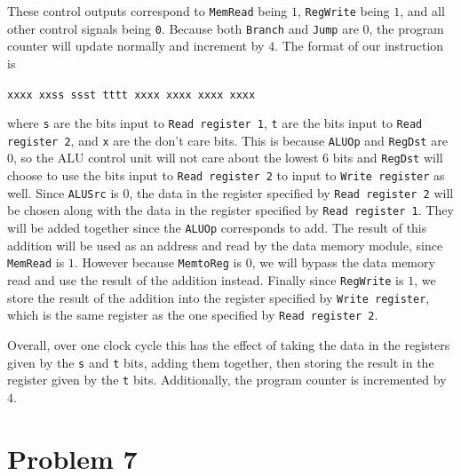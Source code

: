 \documentclass[12pt]{article}
\begin{document}
These control outputs correspond to \texttt{MemRead} being \(1\), \texttt{RegWrite} being \(1\), and all other control signals being
\texttt{0}. Because both \texttt{Branch} and \texttt{Jump} are \(0\), the program counter will update normally and increment by \(4\).
The format of our instruction is
\begin{center}
\texttt{xxxx xxss ssst tttt xxxx xxxx xxxx xxxx}
\end{center}
where \texttt{s} are the bits input to \texttt{Read register 1}, \texttt{t} are the bits input to \texttt{Read register 2}, and
\texttt{x} are the don't care bits. This is because \texttt{ALUOp} and \texttt{RegDst} are \(0\), so the ALU control unit will not care
about the lowest \(6\) bits and \texttt{RegDst} will choose to use the bits input to \texttt{Read register 2} to input to
\texttt{Write register} as well. Since \texttt{ALUSrc} is \(0\), the data in the register specified by \texttt{Read register 2}
will be chosen along with the data in the register specified by \texttt{Read register 1}. They will be added together since
the \texttt{ALUOp} corresponds to add. The result of this addition will be used as an address and read by the data memory module,
since \texttt{MemRead} is \(1\). However because  \texttt{MemtoReg} is \(0\), we will bypass the data memory read and use the result of
the addition instead. Finally since \texttt{RegWrite} is \(1\), we store the result of the addition into the register specified
by \texttt{Write register}, which is the same register as the one specified by \texttt{Read register 2}.

Overall, over one clock cycle this has the effect of taking the data in the registers given by the \texttt{s} and \texttt{t} bits,
adding them together, then storing the result in the register given by the \texttt{t} bits. Additionally, the program counter is
incremented by \(4\).

\pagebreak

\section*{Problem 7}
\end{document}
